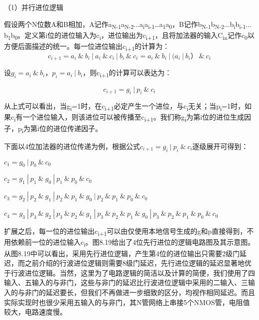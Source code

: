 \documentclass[]{ctexbook}
\begin{document}
（1）并行进位逻辑

假设两个N位数A和B相加，A记作a\textsubscript{N-1}a\textsubscript{N-2}\(\ldots\)a\textsubscript{i}a\textsubscript{i-1}\ldots a\textsubscript{1}a\textsubscript{0}，B记作b\textsubscript{N-1}b\textsubscript{N-2}\(\ldots\)b\textsubscript{i}b\textsubscript{i-1}\(\ldots\)b\textsubscript{1}b\textsubscript{0}。定义第i位的进位输入为c\textsubscript{i}，进位输出为c\textsubscript{i+1}，且将加法器的输入C\textsubscript{in}记作c\textsubscript{0}以方便后面描述的统一。每一位进位输出c\textsubscript{i+1}的计算为：\[c_{i+1}=a_{i}\ \&\ b_{i}\ |\ a_{i}\ \&\ c_{i}\ |\ b_{i}\ \&\ c_{i}=a_{i}\ \&\ b_{i}\ |\ (a_{i}\ |\ b_{i}）\ \&\ c_{i}\]

设\(g_{i} = a_{i} \ \&\ b_{i}，p_{i} = a_{i} \ |\ b_{i}\)，则c\textsubscript{i+1}的计算可以表达为：

\[c_{i+1}=g_{i} \ |\ p_{i} \ \& \ c_{i}\]

从上式可以看出，当g\textsubscript{i}=1时，在c\textsubscript{i+1}必定产生一个进位，与c\textsubscript{i}无关；当p\textsubscript{i}=1时，如果c\textsubscript{i}有一个进位输入，则该进位可以被传播至c\textsubscript{i+1}。我们称g\textsubscript{i}为第i位的进位生成因子，p\textsubscript{i}为第i位的进位传递因子。

下面以4位加法器的进位传递为例，根据公式\(c_{i+1}=g_{i} \ |\ p_{i}\ \&\ c_{i}\)逐级展开可得到：

\(c_{1}=g_{0} \ |\ p_{0} \ \&\ c_{0}\)

\(c_{2}=g_{1}\ |\ p_{1}\ \&\ g_{0}\ |\ p_{1}\ \&\ p_{0}\ \&\ c_{0}\)

\(c_{3}=g_{2}\ |\ p_{2}\ \&\ g_{1}\ |\ p_{2}\ \&\ p_{1} \ \&\ g_{0} \ |\ p_{2}\ \&\ p_{1}\ \&\ p_{0}\ \&\ c_{0}\)

\(c_{4}=g_{3}\ |\ p_{3}\ \&\ g_{2}\ |\ p_{3}\ \&\ p_{2}\ \&\ g_{1}\ |\ p_{3}\ \&\ p_{2}\ \&\ p_{1}\ \&\ g_{0}\ |\ p_{3}\ \&\ p_{2}\ \&\ p_{1}\ \&\ p_{0}\ \&\ c_{0}\)

扩展之后，每一位的进位输出c\textsubscript{i+1}可以由仅使用本地信号生成的g和p直接得到，不用依赖前一位的进位输入c\textsubscript{i}。图8.19给出了4位先行进位的逻辑电路图及其示意图。从图8.19中可以看出，采用先行进位逻辑，产生第4位的进位输出只需要2级门延迟，而之前介绍的行波进位逻辑则需要8级门延迟，先行进位逻辑的延迟显著地优于行波进位逻辑。当然，这里为了电路逻辑的简洁以及计算的简便，我们使用了四输入、五输入的与非门，这些与非门的延迟比行波进位逻辑中采用的二输入、三输入的与非门的延迟要长，但我们不再做进一步细致的区分，均视作相同延迟。而且实际实现时也很少采用五输入的与非门，其N管网络上串接5个NMOS管，电阻值较大，电路速度慢。
\end{document}
